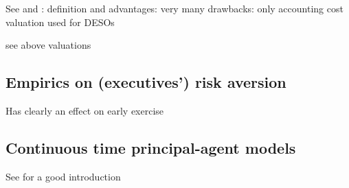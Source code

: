     See \cite{hemmer1998optimal} and \cite{hemmer2000reload}
    \cite{huang2013dynamic}:
        definition and 
        advantages: very many
        drawbacks: only accounting cost
        valuation used for DESOs

    see above valuations 


 



\subsection{Empirics on (executives') risk aversion} %

    Has clearly an effect on early exercise \cite{izhakian2017risk} \cite{murphy2019employees}





\subsection{Continuous time principal-agent models} %
    See \cite{cvitanic2013dynamics} for a good introduction





